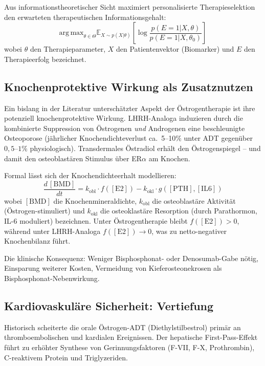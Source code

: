 ﻿\documentclass[a4paper,12pt]{article}
\theoremstyle{definition}
\begin{document}
Aus informationstheoretischer Sicht maximiert personalisierte Therapieselektion den erwarteten therapeutischen Informationsgehalt:
\begin{equation}
  \mathrm{arg\,max}_{\theta \in \Theta} \mathbb{E}_{X \sim p(X|\theta)} \left[\log \frac{p(E=1 | X, \theta)}{p(E=1 | X, \theta_0)}\right]
\end{equation}
wobei $\theta$ den Therapieparameter, $X$ den Patientenvektor (Biomarker) und $E$ den Therapieerfolg bezeichnet.

\subsection{Knochenprotektive Wirkung als Zusatznutzen}

Ein bislang in der Literatur unterschätzter Aspekt der Östrogentherapie ist ihre potenziell knochenprotektive Wirkung.
LHRH-Analoga induzieren durch die kombinierte Suppression von Östrogenen \textit{und} Androgenen eine beschleunigte Osteoporose (jährlicher Knochendichteverlust ca.\ 5--10\% unter ADT gegenüber $0{,}5$--$1\%$ physiologisch).
Transdermales Östradiol erhält den Östrogenspiegel -- und damit den osteoblastären Stimulus über ER$\alpha$ am Knochen.

Formal lässt sich der Knochendichteerhalt modellieren:
\begin{equation}
  \frac{d\,[\mathrm{BMD}]}{dt} = k_{\mathrm{obl}} \cdot f([\mathrm{E2}]) - k_{\mathrm{okl}} \cdot g([\mathrm{PTH}], [\mathrm{IL6}])
\end{equation}
wobei $[\mathrm{BMD}]$ die Knochenmineraldichte, $k_{\mathrm{obl}}$ die osteoblastäre Aktivität (Östrogen-stimu\-liert) und $k_{\mathrm{okl}}$ die osteoklastäre Resorption (durch Parathormon, IL-6 moduliert) bezeichnen.
Unter Östrogentherapie bleibt $f([\mathrm{E2}]) > 0$, während unter LHRH-Analoga $f([\mathrm{E2}]) \to 0$, was zu netto-negativer Knochenbilanz führt.

Die klinische Konsequenz: Weniger Bisphosphonat- oder Denosumab-Gabe nötig, Einsparung weiterer Kosten, Vermeidung von Kieferosteonekrosen als Bisphosphonat-Nebenwirkung.

\subsection{Kardiovaskuläre Sicherheit: Vertiefung}

Historisch scheiterte die orale Östrogen-ADT (Diethylstilbestrol) primär an thromboembolischen und kardialen Ereignissen.
Der hepatische First-Pass-Effekt führt zu erhöhter Synthese von Gerinnungsfaktoren (F-VII, F-X, Prothrombin), C-reaktivem Protein und Triglyzeriden.
\end{document}
